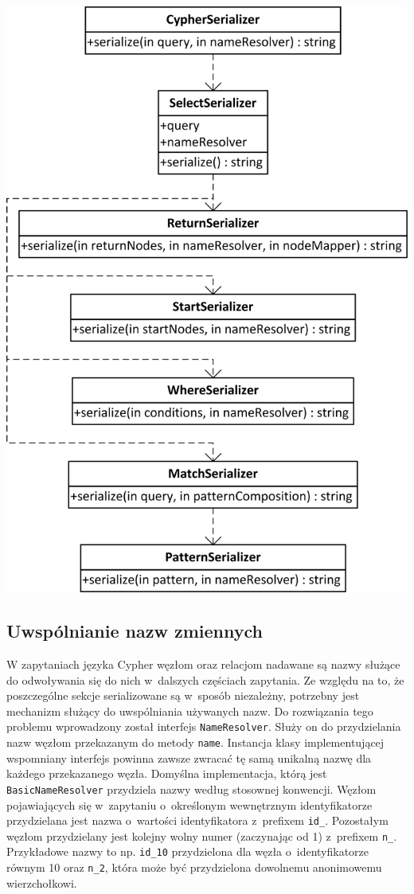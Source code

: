 \documentclass[brudnopis]{xmgr}
\begin{document}
\newpage

\begin{center}
	\includegraphics[scale=1]{images/cypher-serialization-uml.png}
\end{center}

\subsection{Uwspólnianie nazw zmiennych}

W zapytaniach języka Cypher węzłom oraz relacjom nadawane są nazwy służące do odwoływania się do nich w~dalszych częściach zapytania. Ze względu na to, że poszczególne sekcje serializowane są w~sposób niezależny, potrzebny jest mechanizm służący do uwspólniania używanych nazw. Do rozwiązania tego problemu wprowadzony został interfejs \texttt{NameResolver}. Służy on do przydzielania nazw węzłom przekazanym do metody \texttt{name}. Instancja klasy implementującej wspomniany interfejs powinna zawsze zwracać tę samą unikalną nazwę dla każdego przekazanego węzła. Domyślna implementacja, którą jest \texttt{BasicNameResolver} przydziela nazwy według stosownej konwencji. Węzłom pojawiających się w~zapytaniu o~określonym wewnętrznym identyfikatorze przydzielana jest nazwa o~wartości identyfikatora z~prefixem \texttt{id\_}. Pozostałym węzłom przydzielany jest kolejny wolny numer (zaczynając od 1) z~prefixem \texttt{n\_}. Przykładowe nazwy to np. \texttt{id\_10} przydzielona dla węzła o~identyfikatorze równym 10 oraz \texttt{n\_2}, która może być przydzielona dowolnemu anonimowemu wierzchołkowi.
\end{document}
